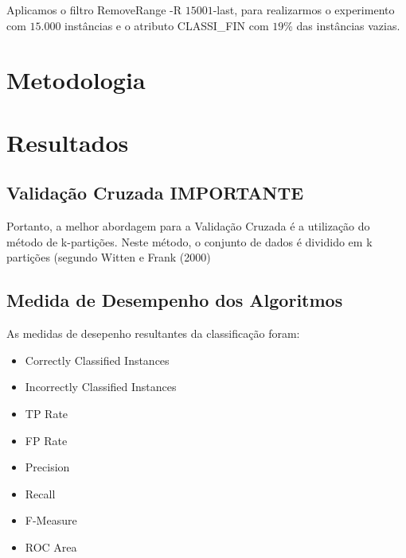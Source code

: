 \documentclass[
	12pt,				%
	openright,			%
	oneside,	
	a4paper,				%
	english,				%
	brazil				%
]{abntex2/abntex2} %
\begin{document}
		Aplicamos o filtro RemoveRange -R $15001$-last, para realizarmos o experimento com $15.000$ instâncias e o atributo CLASSI_FIN com $19$\% das instâncias vazias.

		
\chapter{Metodologia}

	
		
		
	
		
\chapter{Resultados}

	\section{Validação Cruzada IMPORTANTE}
	
	Portanto, a melhor abordagem para a Validação Cruzada é a utilização do método de k-partições. Neste método, o conjunto de dados é dividido em k partições (segundo Witten e Frank (2000)

	\section{Medida de Desempenho dos Algoritmos}
	
	As medidas de desepenho resultantes da classificação foram: 
	
	\begin{itemize}
		\item Correctly Classified Instances
		\item Incorrectly Classified Instances
		\item TP Rate
		\item FP Rate
		\item Precision
		\item Recall
		\item F-Measure
		\item ROC Area
	\end{itemize}
	
\end{document}
